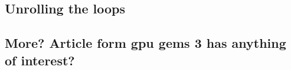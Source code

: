 \subsection{Unrolling the loops}









\subsection{More? Article form gpu gems 3 has anything of interest?}
